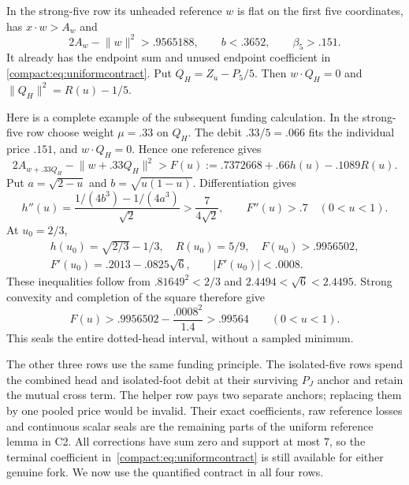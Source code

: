 \documentclass[11pt]{article}
\theoremstyle{remark}\newtheorem{remark}[theorem]{Remark}
\numberwithin{equation}{section}
\newcommand{\norm}[1]{\lVert #1\rVert}
\begin{document}
In the strong-five row its unheaded reference $w$ is flat on the first
five coordinates, has $x\cdot w>A_w$ and
\[
 2A_w-\norm w^2>.9565188,\qquad b<.3652,
 \qquad \beta_5>.151.
\]
It already has the endpoint sum and unused endpoint coefficient in
\eqref{compact:eq:uniformcontract}. Put $Q_H=Z_u-P_5/5$.
Then $w\cdot Q_H=0$ and $\norm{Q_H}^2=R(u)-1/5$.

Here is a complete example of the subsequent funding calculation.
In the strong-five row choose weight $\mu=.33$ on $Q_H$.
The debit $.33/5=.066$ fits the individual price $.151$, and
$w\cdot Q_H=0$. Hence one reference gives
\[
 2A_{w+.33Q_H}-\norm{w+.33Q_H}^2>F(u):=.7372668+.66h(u)-.1089R(u).
\]
Put $a=\sqrt{2-u}$ and $b=\sqrt{u(1-u)}$. Differentiation gives
\[
 h''(u)=\frac{1/(4b^3)-1/(4a^3)}{\sqrt2}>
 \frac7{4\sqrt2},\qquad F''(u)>.7\quad(0<u<1).
\]
At $u_0=2/3$,
\[
 \begin{gathered}
 h(u_0)=\sqrt{2/3}-1/3,\quad R(u_0)=5/9,\quad F(u_0)>.9956502,\\
 F'(u_0)=.2013-.0825\sqrt6,\qquad |F'(u_0)|<.0008.
 \end{gathered}
\]
These inequalities follow from $.81649^2<2/3$ and
$2.4494<\sqrt6<2.4495$. Strong convexity and completion of the
square therefore give
\[
 F(u)>.9956502-\frac{.0008^2}{1.4}>.99564
 \qquad(0<u<1).
\]
This seals the entire dotted-head interval, without a sampled minimum.

The other three rows use the same funding principle. The isolated-five
rows spend the combined head and isolated-foot debit at their surviving
$P_J$ anchor and retain the mutual cross term. The helper row pays two
separate anchors; replacing them by one pooled price would be invalid.
Their exact coefficients, raw reference losses and continuous scalar
seals are the remaining parts of the uniform reference lemma in C2.
All corrections have sum zero and support at most $7$, so the terminal
coefficient in~\eqref{compact:eq:uniformcontract} is still available for
either genuine fork. We now use the quantified contract in all four rows.
\end{document}
